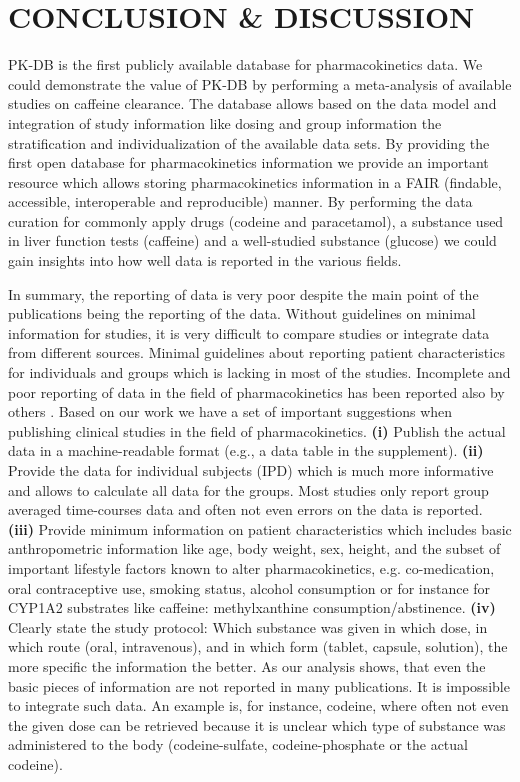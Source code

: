 \documentclass[a4,center,fleqn]{NAR}
\begin{document}
\section{CONCLUSION \& DISCUSSION}

PK-DB is the first publicly available database for pharmacokinetics data. We could demonstrate the value of PK-DB by performing a meta-analysis of available studies on caffeine clearance. The database allows based on the data model and integration of study information like dosing and group information the stratification and individualization of the available data sets.
By providing the first open database for pharmacokinetics information we provide an important resource which allows storing pharmacokinetics information in a FAIR (findable, accessible, interoperable and reproducible) manner. 
By performing the data curation for commonly apply drugs (codeine and paracetamol), a substance used in liver function tests (caffeine) and a well-studied substance (glucose) we could gain insights into how well data is reported in the various fields.

In summary, the reporting of data is very poor despite the main point of the publications being the reporting of the data. Without guidelines on minimal information for studies, it is very difficult to compare studies or integrate data from different sources. Minimal guidelines about reporting patient characteristics for individuals and groups which is lacking in most of the studies. Incomplete and poor reporting of data in the field of pharmacokinetics has been reported also by others \cite{Kanji2015, Dykstra2015}.
Based on our work we have a set of important suggestions when publishing clinical studies in the field of pharmacokinetics. \textbf{(i)} Publish the actual data in a machine-readable format (e.g., a data table in the supplement). \textbf{(ii)} Provide the data for individual subjects (IPD) which is much more informative and allows to calculate all data for the groups. Most studies only report group averaged time-courses data and often not even errors on the data is reported. \textbf{(iii)} Provide minimum information on patient characteristics which includes basic anthropometric information like age, body weight, sex, height, and the subset of important lifestyle factors known to alter pharmacokinetics, e.g. co-medication, oral contraceptive use, smoking status, alcohol consumption or for instance for CYP1A2 substrates like caffeine: methylxanthine consumption/abstinence. \textbf{(iv)} Clearly state the study protocol: Which substance was given in which dose, in which route (oral, intravenous), and in which form (tablet, capsule, solution), the more specific the information the better.
As our analysis shows, that even the basic pieces of information are not reported in many publications. It is impossible to integrate such data. An example is, for instance, codeine, where often not even the given dose can be retrieved because it is unclear which type of substance was administered to the body (codeine-sulfate, codeine-phosphate or the actual codeine). 
\end{document}
